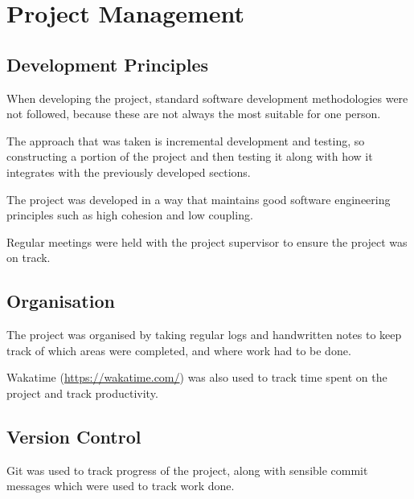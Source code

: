 \section{Project Management}
\subsection{Development Principles}
When developing the project, standard software development meth\-odologies were not followed, because these are not always the most suitable for one person.\par
The approach that was taken is incremental development and testing, so constructing a portion of the project and then testing it along with how it integrates with the previously developed sections.\par
The project was developed in a way that maintains good software engineering principles such as high cohesion and low coupling.\par
Regular meetings were held with the project supervisor to ensure the project was on track.
\subsection{Organisation}
The project was organised by taking regular logs and handwritten notes to keep track of which areas were completed, and where work had to be done.\par
Wakatime (\url{https://wakatime.com/}) was also used to track time spent on the project and track productivity.
\subsection{Version Control}
Git was used to track progress of the project, along with sensible commit messages which were used to track work done.
